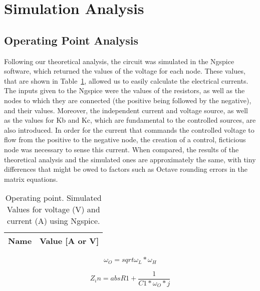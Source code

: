 \section{Simulation Analysis}
\label{sec:simulation}

\subsection{Operating Point Analysis}

Following our theoretical analysis, the circuit was simulated in the Ngspice software, which returned the values of the voltage for each node. These values, that are shown in Table~\ref{tab:op}, allowed us to easily calculate the electrical currents. 
The inputs given to the Ngspice were the values of the resistors, as well as the nodes to which they are connected (the positive being followed by the negative), and their values. Moreover, the independent current and voltage source, as well as the values for Kb and Kc, which are fundamental to the controlled sources, are also introduced. 
In order for the current that commands the controlled voltage to flow from the positive to the negative node, the creation of a control, ficticious node was necessary to sense this current.
When compared, the results of the theoretical analysis and the simulated ones are approximately the same, with tiny differences that might be owed to factors such as Octave rounding errors in the matrix equations.

\vspace{7.0cm}

\begin{table}[h]
  \centering
  \begin{tabular}{|l|r|}
    \hline    
    {\bf Name} & {\bf Value [A or V]} \\ \hline
    
  \end{tabular}
  \caption{Operating point. Simulated Values for voltage (V) and current (A) using Ngspice.}
  \label{tab:op}
\end{table}

\begin{equation}
\omega_O = sqrt{\omega_L * \omega_H}
\end{equation}

\begin{equation}
Z_in = abs{R1 + \frac{1}{C1*\omega_O *j}}
\end{equation}





